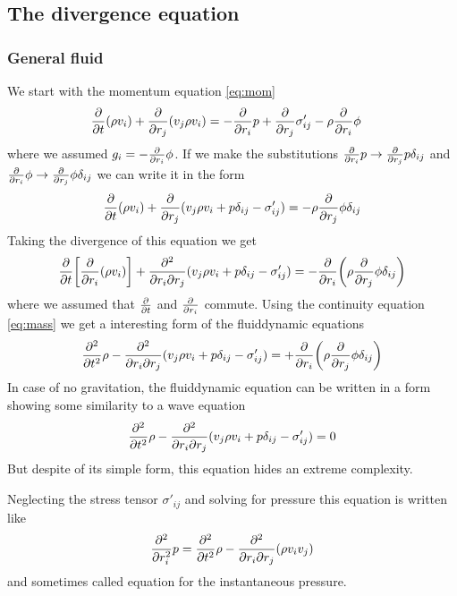\subsection{The divergence equation}\label{diveq}
\subsubsection{General fluid}
We start with the momentum equation \eqref{eq:mom}
\begin{align*}
\frac{\partial}{\partial t}(\rho v_i) + \frac{\partial}{\partial r_j}(v_j \rho v_i) &= -\frac{\partial}{\partial r_i}p + \frac{\partial}{\partial r_j}\sigma'_{ij}
-\rho \frac{\partial}{\partial r_i} \phi
\end{align*}
where we assumed $g_i=-\frac{\partial}{\partial r_i} \phi$. If we make the substitutions 
$\frac{\partial}{\partial r_i} p \rightarrow \frac{\partial}{\partial r_j} p \delta_{ij}$ and 
$\frac{\partial}{\partial r_i} \phi \rightarrow \frac{\partial}{\partial r_j} \phi \delta_{ij}$ we can write it in the 
form
\begin{align*}
\frac{\partial}{\partial t}(\rho v_i) + \frac{\partial}{\partial r_j}(v_j \rho v_i + p \delta_{ij} - \sigma'_{ij}) 
= -\rho \frac{\partial}{\partial r_j} \phi \delta_{ij}
\end{align*}
Taking the divergence of this equation we get
\begin{align*}
\frac{\partial}{\partial t}{ \left[ \frac{\partial}{\partial r_i} (\rho v_i) \right] } 
+ \frac{\partial^2}{\partial r_i \partial r_j}(v_j \rho v_i + p \delta_{ij} - \sigma'_{ij}) 
= -\frac{\partial}{\partial r_i}{ \left( \rho \frac{\partial}{\partial r_j} \phi \delta_{ij} \right) }
\end{align*}
where we assumed that $\frac{\partial}{\partial t}$ and $\frac{\partial}{\partial r_i}$ commute. Using the continuity 
equation \ref{eq:mass} we get a interesting form of the fluiddynamic 
equations
\begin{align}
\frac{\partial^2}{\partial t^2}\rho 
- \frac{\partial^2}{\partial r_i \partial r_j}(v_j \rho v_i + p \delta_{ij} - \sigma'_{ij}) 
= +\frac{\partial}{\partial r_i}{ \left( \rho \frac{\partial}{\partial r_j} \phi \delta_{ij} \right) }\label{eq:divbeauty}
\end{align}
In case of no gravitation, the fluiddynamic equation can be written in a form
showing some similarity to a wave equation
\begin{align}
\frac{\partial^2}{\partial t^2}\rho 
- \frac{\partial^2}{\partial r_i \partial r_j}(v_j \rho v_i + p \delta_{ij} - \sigma'_{ij}) 
= 0
\end{align}
But despite of its simple form, this equation hides an extreme complexity.

Neglecting the stress tensor $\sigma'_{ij}$ and solving for pressure this
equation is written like
\begin{align}
\frac{\partial^2}{\partial r_i^2} p = \frac{\partial^2}{\partial t^2}\rho- 
\frac{\partial^2}{\partial r_i \partial r_j}(\rho v_i v_j)\label{eq:instpres}
\end{align}
and sometimes called equation for the instantaneous pressure.

